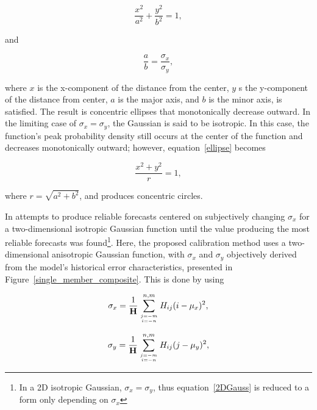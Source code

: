    \begin{equation}
        \label{ellipse}
        \frac{x^2}{a^2} + \frac{y^2}{b^2} = 1,
    \end{equation}

\noindent and

    \begin{equation}
        \frac{a}{b} = \frac{\sigma_x}{\sigma_y},
    \end{equation}

\noindent where $x$ is the x-component of the distance from the center, $y$ s the y-component of the distance from center, $a$ is the major axis, and $b$ is the minor axis, is satisfied. The result is concentric ellipses that monotonically decrease outward. In the limiting case of $\sigma_x = \sigma_y$, the Gaussian is said to be isotropic. In this case, the function's peak probability density still occurs at the center of the function and decreases monotonically outward; however, \mbox{equation \ref{ellipse}} becomes

    \begin{equation*}
        \frac{x^2 + y^2}{r} = 1,
    \end{equation*}

\noindent where $r = \sqrt{a^2 + b^2}$, and produces concentric circles.

In \cite{Sobash2010} attempts to produce reliable forecasts centered on subjectively changing $\sigma_x$ for a two-dimensional isotropic Gaussian function until the value producing the most reliable forecasts was found\footnote{In a 2D isotropic Gaussian, $\sigma_x = \sigma_y$, thus \mbox{equation \ref{2DGauss}} is reduced to a form only depending on $\sigma_x$}. Here, the proposed calibration method uses a two-dimensional anisotropic Gaussian function, with $\sigma_x$ and $\sigma_y$ objectively derived from the model's historical error characteristics, presented in \mbox{Figure \ref{single_member_composite}}. This is done by using

    \begin{equation}
        \label{sigmax}
        \sigma_x = \frac{1}{\mathbf{H}} \sum\limits_{j=-m \atop i=-n}^{n,m}H_{ij}(i - \mu_x)^2,
    \end{equation}

    \begin{equation}
        \label{sigmay}
        \sigma_y = \frac{1}{\mathbf{H}} \sum\limits_{j=-m \atop i=-n}^{n,m}H_{ij}(j - \mu_y)^2,
    \end{equation}

